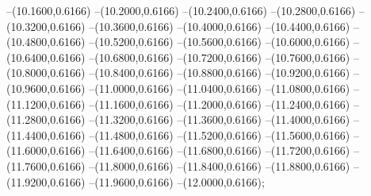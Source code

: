 {	--(10.1600,0.6166)
	--(10.2000,0.6166)
	--(10.2400,0.6166)
	--(10.2800,0.6166)
	--(10.3200,0.6166)
	--(10.3600,0.6166)
	--(10.4000,0.6166)
	--(10.4400,0.6166)
	--(10.4800,0.6166)
	--(10.5200,0.6166)
	--(10.5600,0.6166)
	--(10.6000,0.6166)
	--(10.6400,0.6166)
	--(10.6800,0.6166)
	--(10.7200,0.6166)
	--(10.7600,0.6166)
	--(10.8000,0.6166)
	--(10.8400,0.6166)
	--(10.8800,0.6166)
	--(10.9200,0.6166)
	--(10.9600,0.6166)
	--(11.0000,0.6166)
	--(11.0400,0.6166)
	--(11.0800,0.6166)
	--(11.1200,0.6166)
	--(11.1600,0.6166)
	--(11.2000,0.6166)
	--(11.2400,0.6166)
	--(11.2800,0.6166)
	--(11.3200,0.6166)
	--(11.3600,0.6166)
	--(11.4000,0.6166)
	--(11.4400,0.6166)
	--(11.4800,0.6166)
	--(11.5200,0.6166)
	--(11.5600,0.6166)
	--(11.6000,0.6166)
	--(11.6400,0.6166)
	--(11.6800,0.6166)
	--(11.7200,0.6166)
	--(11.7600,0.6166)
	--(11.8000,0.6166)
	--(11.8400,0.6166)
	--(11.8800,0.6166)
	--(11.9200,0.6166)
	--(11.9600,0.6166)
	--(12.0000,0.6166);
}
